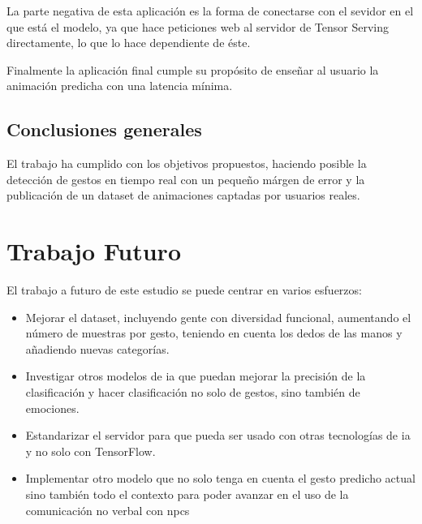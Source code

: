 La parte negativa de esta aplicación es la forma de conectarse con el sevidor en el que está el modelo, ya que hace peticiones web al servidor de Tensor Serving directamente, lo que lo hace dependiente de éste.

Finalmente la aplicación final cumple su propósito de enseñar al usuario la animación predicha con una latencia mínima.

\subsection{Conclusiones generales}
El trabajo ha cumplido con los objetivos propuestos, haciendo posible la detección de gestos en tiempo real con un pequeño márgen de error y la publicación de un dataset de animaciones captadas por usuarios reales.

\section{Trabajo Futuro}

El trabajo a futuro de este estudio se puede centrar en varios esfuerzos:
\begin{itemize}
    \item Mejorar el dataset, incluyendo gente con diversidad funcional, aumentando el número de muestras por gesto, teniendo en cuenta los dedos de las manos y añadiendo nuevas categorías.
    \item Investigar otros modelos de \gls{ia} que puedan mejorar la precisión de la clasificación y hacer clasificación no solo de gestos, sino también de emociones.
    \item Estandarizar el servidor para que pueda ser usado con otras tecnologías de \gls{ia} y no solo con TensorFlow.
    \item Implementar otro modelo que no solo tenga en cuenta el gesto predicho actual sino también todo el contexto para poder avanzar en el uso de la comunicación no verbal con \glspl{npc}
\end{itemize}




